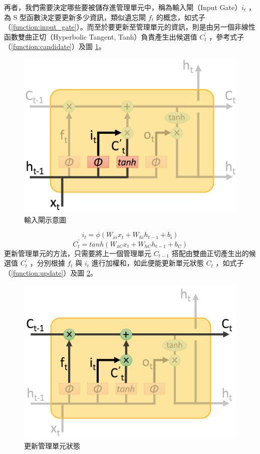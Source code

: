 再者，我們需要決定哪些要被儲存進管理單元中，稱為輸入閘（Input Gate）$i_t$ ，為 S 型函數決定要更新多少資訊，類似遺忘閘 $f_t$ 的概念，如式子（\ref{function:input_gate}）。而至於要更新至管理單元的資訊，則是由另一個非線性函數雙曲正切（Hyperbolic Tangent, Tanh）負責產生出候選值 $C_t^{'}$ ，參考式子（\ref{function:candidate}）及圖 \ref{fig:input_gate}。
\begin{figure}[h]
    \centering
    \includegraphics[scale=0.35]{images/chap2_input.png}
    \caption{輸入閘示意圖\cite{shen2016} }\label{fig:input_gate}
\end{figure}
\begin{equation}
    i_t = \phi(W_{xi}x_t + W_{hi}h_{t-1} + b_i) \label{function:input_gate}
\end{equation}
\begin{equation}
    C_t^{'} = tanh(W_{xC}x_t + W_{hC}h_{t-1} + b_C) \label{function:candidate}
\end{equation}
更新管理單元的方法，只需要將上一個管理單元 $C_{t-1}$ 搭配由雙曲正切產生出的候選值 $C_t^{'}$ ，分別根據 $f_t$ 與 $i_t$ 進行加權和，如此便能更新單元狀態 $C_t$ ，如式子（\ref{function:update}）及圖 \ref{fig:update}。
\begin{figure}[h]
    \centering
    \includegraphics[scale=0.35]{images/chap2_update.png}
    \caption{更新管理單元狀態\cite{shen2016} }\label{fig:update}
\end{figure}
